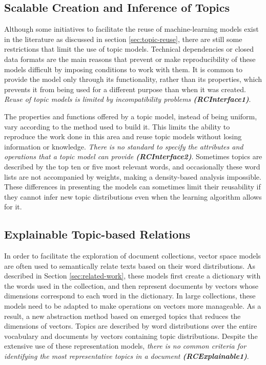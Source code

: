 \subsection{Scalable Creation and Inference of Topics}

Although some initiatives to facilitate the reuse of machine-learning models exist in the literature as discussed in section \ref{sec:topic-reuse}, there are still some restrictions that limit the use of topic models. Technical dependencies or closed data formats are the main reasons that prevent or make reproducibility of these models difficult by imposing conditions to work with them. It is common to provide the model only through its functionality, rather than its properties, which prevents it from being used for a different purpose than when it was created. \textit{Reuse of topic models is limited by incompatibility problems \textbf{(RCInterface1)}}.

The properties and functions offered by a topic model, instead of being uniform, vary according to the method used to build it. This limits the ability to reproduce the work done in this area and reuse topic models without losing information or knowledge. \textit{There is no standard to specify the attributes and operations that a topic model can provide \textbf{(RCInterface2)}}. Sometimes topics are described by the top ten or five most relevant words, and occasionally these word lists are not accompanied by weights, making a density-based analysis impossible. These differences in presenting the models can sometimes limit their reusability if they cannot infer new topic distributions even when the learning algorithm allows for it.


\subsection{Explainable Topic-based Relations}

In order to facilitate the exploration of document collections, vector space models are often used to semantically relate texts based on their word distributions. As described in Section \ref{sec:related-work}, these models first create a dictionary with the words used in the collection, and then represent  documents by vectors whose dimensions correspond to each word in the dictionary. In large collections, these models need to be adapted to make operations on vectors more manageable. As a result, a new abstraction method based on emerged topics that reduces the dimensions of vectors. Topics are described by word distributions over the entire vocabulary and documents by vectors containing topic distributions. Despite the extensive use of these representation models, \textit{there is no common criteria for identifying the most representative topics in a document \textbf{(RCExplainable1)}}. 

